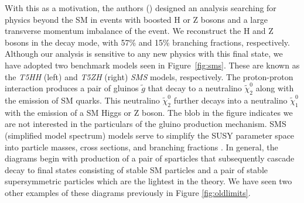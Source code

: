 With this as a motivation, the authors (\cite{CMS-SUS-17-006}) designed an analysis searching for physics beyond the SM in events with boosted H or Z bosons and a large transverse momentum imbalance of the event. We reconstruct the H and Z bosons in the \bbbar decay mode, with 57\% and 15\% branching fractions, respectively. Although our analysis is sensitive to any new physics with this final state, we have adopted two benchmark models seen in Figure~\ref{fig:sms}. These are known as the \textit{T5HH} (left) and \textit{T5ZH} (right) \textit{SMS} models, respectively. The proton-proton interaction produces a pair of gluinos $\tilde{g}$ that decay to a neutralino $\tilde{\chi}_{2}^{0}$ along with the emission of SM quarks. This neutralino $\tilde{\chi}_{2}^{0}$ further decays into a neutralino $\tilde{\chi}_{1}^{0}$ with the emission of a SM Higgs or Z boson. The blob in the figure indicates we are not interested in the particulars of the gluino production mechanism. SMS (simplified model spectrum) models serve to simplify the SUSY parameter space into particle masses, cross sections, and branching fractions \cite{CMS-SUS-11-016}. In general, the diagrams begin with production of a pair of sparticles that subsequently cascade decay to final states consisting of stable SM particles and a pair of stable supersymmetric particles which are the lightest in the theory. We have seen two other examples of these diagrams previously in Figure \ref{fig:oldlimits}.

